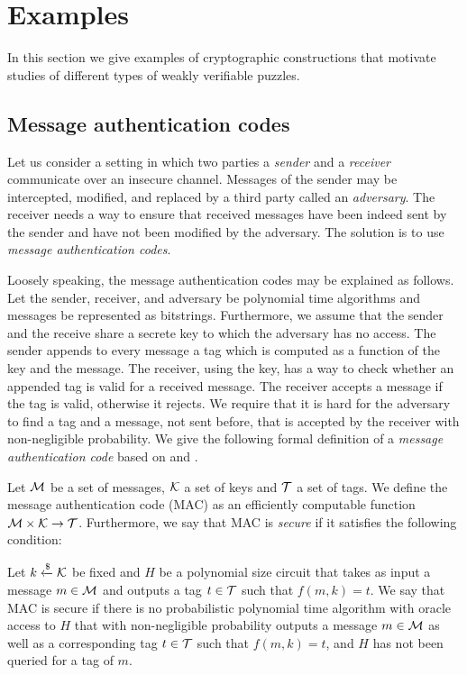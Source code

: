 \section{Examples}
\label{section:wvp_examples}
In this section we give examples of cryptographic constructions that motivate studies of different types of weakly verifiable puzzles.

\subsection{Message authentication codes}
Let us consider a setting in which two parties a \textit{sender} and a \textit{receiver} communicate over an insecure channel.
Messages of the sender may be intercepted, modified, and replaced by a third party called an \textit{adversary}.
The receiver needs a way to ensure that received messages have been indeed sent by the sender and have not been modified by the adversary.
The solution is to use \textit{message authentication codes}.

Loosely speaking, the message authentication codes may be explained as follows.
Let the sender, receiver, and adversary be polynomial time algorithms and messages be represented as bitstrings.
Furthermore, we assume that the sender and the receive share a secrete key to which the adversary has no access.
The sender appends to every message a tag which is computed as a function of the key and the message.
The receiver, using the key, has a way to check whether an appended tag is valid for a received message.
The receiver accepts a message if the tag is valid, otherwise it rejects.
We require that it is hard for the adversary to find a tag and a message, not sent before, that is accepted by the receiver with non-negligible probability.
We give the following formal definition of a \textit{message authentication code} based on \cite{LectureNotesCrypo} and \cite{Goldreich:2004:FCV:975541}.
\begin{definition}
  \label{def:mac}
  Let $\mathcal{M}$ be a set of messages, $\mathcal{K}$ a set of keys and $\mathcal{T}$ a set of tags.
  We define the \textnormal{message authentication code (MAC)} as an efficiently computable function $\mathcal{M} \times \mathcal{K} \rightarrow \mathcal{T}$.
  Furthermore, we say that MAC is \textit{secure} if it satisfies the following condition:

  Let $k \xleftarrow{\$} \mathcal{K}$ be fixed and $H$ be a polynomial size circuit that takes as input a message $m \in \mathcal{M}$ and outputs a tag $t \in \mathcal{T}$
  such that $f(m,k) = t$. We say that MAC is secure if there is no probabilistic polynomial time algorithm
  with oracle access to $H$ that with non-negligible probability outputs a message $m \in \mathcal{M}$
  as well as a corresponding tag $t \in \mathcal{T}$ such that $f(m, k) = t$, and $H$ has not been queried for a tag of $m$.
\end{definition}

